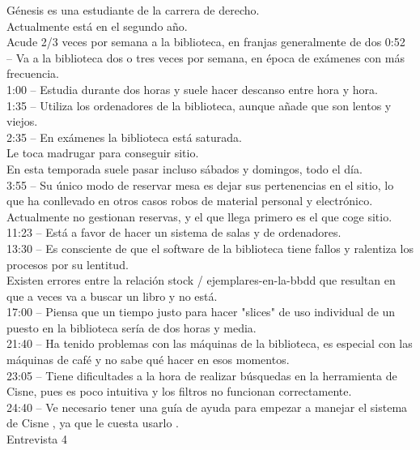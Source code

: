 \documentclass[12pt]{article}
\begin{document}
Génesis es una estudiante de la carrera de  derecho.\\ Actualmente está en el segundo año.\\
Acude 2/3 veces por semana a la biblioteca, en franjas generalmente de dos
0:52 –  Va a la biblioteca dos o tres veces por semana, en época de exámenes con más frecuencia.\\
1:00 –   Estudia durante dos horas y suele hacer descanso entre hora y hora.\\
1:35 – Utiliza los ordenadores de la biblioteca, aunque añade que son lentos y viejos.\\
2:35 – En exámenes la biblioteca está saturada.\\ Le toca madrugar para conseguir sitio.\\ En esta temporada suele pasar incluso sábados y domingos, todo el día.\\
3:55 – Su único modo de reservar mesa es dejar sus pertenencias en el sitio, lo que ha conllevado en otros casos robos de material personal y electrónico.\\ Actualmente no gestionan reservas, y el que llega primero es el que coge sitio.\\
11:23 – Está a favor de hacer un sistema de salas y de ordenadores.\\
13:30 – Es consciente de que el software de la biblioteca tiene fallos y ralentiza los procesos por su lentitud.\\ Existen errores entre la relación stock / ejemplares-en-la-bbdd que resultan en que a veces va a buscar un libro y no está.\\
17:00 – Piensa que un tiempo justo para hacer "slices" de uso individual de un puesto en la biblioteca sería de dos horas y media.\\
21:40 –  Ha tenido problemas con las máquinas de la biblioteca, es especial con las máquinas de café y no sabe qué hacer en esos momentos.\\ 
23:05 – Tiene dificultades a la hora de realizar búsquedas en la herramienta de Cisne, pues es poco intuitiva y los filtros no funcionan correctamente.\\
24:40 – Ve necesario tener una guía de ayuda para empezar a manejar el sistema de Cisne , ya que le cuesta usarlo .\\

Entrevista 4 
\end{document}
